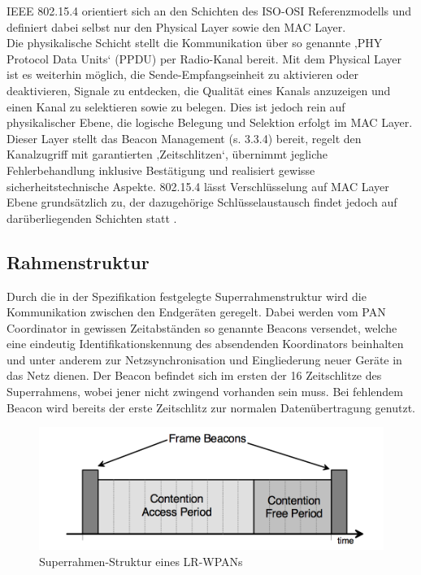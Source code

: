 IEEE 802.15.4 orientiert sich an den Schichten des ISO-OSI Referenzmodells und definiert dabei selbst nur den Physical Layer sowie den MAC Layer. \\
Die physikalische Schicht stellt die Kommunikation über so genannte ‚PHY Protocol Data Units‘ (PPDU) per Radio-Kanal bereit. Mit dem Physical Layer ist es weiterhin möglich, die Sende-Empfangseinheit zu aktivieren oder deaktivieren, Signale zu entdecken, die Qualität eines Kanals anzuzeigen und einen Kanal zu selektieren sowie zu belegen. Dies ist jedoch rein auf physikalischer Ebene, die logische Belegung und Selektion erfolgt im MAC Layer.
Dieser Layer stellt das Beacon Management (s. 3.3.4) bereit, regelt den Kanalzugriff mit garantierten ‚Zeitschlitzen‘, übernimmt jegliche Fehlerbehandlung inklusive Bestätigung und realisiert gewisse sicherheitstechnische Aspekte. 802.15.4 lässt Verschlüsselung auf MAC Layer Ebene grundsätzlich zu, der dazugehörige Schlüsselaustausch findet jedoch auf darüberliegenden Schichten statt \cite{d:hesse} \cite{d:ieee}.

\subsection{Rahmenstruktur}\label{ss:Rahmenstruktur}

Durch die in der Spezifikation festgelegte Superrahmenstruktur wird die Kommunikation zwischen den Endgeräten geregelt. Dabei werden vom PAN Coordinator in gewissen Zeitabständen so genannte Beacons versendet, welche eine eindeutig Identifikationskennung des absendenden Koordinators beinhalten und unter anderem zur Netzsynchronisation und Eingliederung neuer Geräte in das Netz dienen. Der Beacon befindet sich im ersten der 16 Zeitschlitze des Superrahmens, wobei jener nicht zwingend vorhanden sein muss. Bei fehlendem Beacon wird bereits der erste Zeitschlitz zur normalen Datenübertragung genutzt. \\

\begin{figure}[H] 
	\centering
	\includegraphics[scale=0.8]{Bilder/superrahmen}
	\caption{Superrahmen-Struktur eines LR-WPANs\cite{d:ieee}}
	\label{f:superrahmen}
\end{figure}

